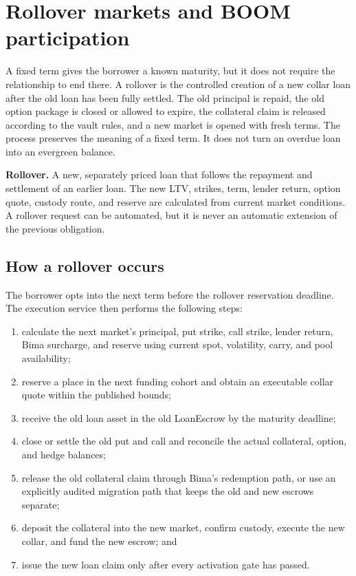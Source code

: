 \documentclass[11pt,oneside]{article}
\newcommand{\BOOM}{\textsf{BOOM}}
\begin{document}
\section{Rollover markets and \BOOM{} participation}

A fixed term gives the borrower a known maturity, but it does not require the
relationship to end there. A rollover is the controlled creation of a new
collar loan after the old loan has been fully settled. The old principal is
repaid, the old option package is closed or allowed to expire, the collateral
claim is released according to the vault rules, and a new market is opened with
fresh terms. The process preserves the meaning of a fixed term. It does not
turn an overdue loan into an evergreen balance.

\begin{definitionbox}
\textbf{Rollover.} A new, separately priced loan that follows the repayment and
settlement of an earlier loan. The new LTV, strikes, term, lender return,
option quote, custody route, and reserve are calculated from current market
conditions. A rollover request can be automated, but it is never an automatic
extension of the previous obligation.
\end{definitionbox}

\subsection{How a rollover occurs}

The borrower opts into the next term before the rollover reservation deadline.
The execution service then performs the following steps:

\begin{enumerate}
\item calculate the next market's principal, put strike, call strike, lender
return, Bima surcharge, and reserve using current spot, volatility, carry, and
pool availability;
\item reserve a place in the next funding cohort and obtain an executable
collar quote within the published bounds;
\item receive the old loan asset in the old LoanEscrow by the maturity deadline;
\item close or settle the old put and call and reconcile the actual collateral,
option, and hedge balances;
\item release the old collateral claim through Bima's redemption path,
or use an explicitly audited migration path that keeps the old and new escrows
separate;
\item deposit the collateral into the new market, confirm custody, execute the
new collar, and fund the new escrow; and
\item issue the new loan claim only after every activation gate has passed.
\end{enumerate}
\end{document}
